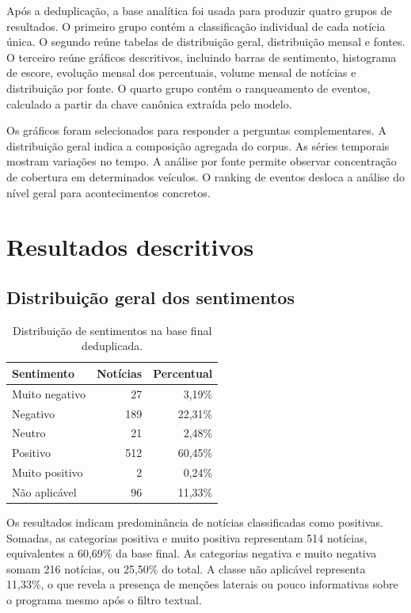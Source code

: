 \documentclass[12pt,a4paper]{article}
\begin{document}
Após a deduplicação, a base analítica foi usada para produzir quatro grupos de resultados. O primeiro grupo contém a classificação individual de cada notícia única. O segundo reúne tabelas de distribuição geral, distribuição mensal e fontes. O terceiro reúne gráficos descritivos, incluindo barras de sentimento, histograma de escore, evolução mensal dos percentuais, volume mensal de notícias e distribuição por fonte. O quarto grupo contém o ranqueamento de eventos, calculado a partir da chave canônica extraída pelo modelo.

Os gráficos foram selecionados para responder a perguntas complementares. A distribuição geral indica a composição agregada do corpus. As séries temporais mostram variações no tempo. A análise por fonte permite observar concentração de cobertura em determinados veículos. O ranking de eventos desloca a análise do nível geral para acontecimentos concretos.

\section{Resultados descritivos}

\subsection{Distribuição geral dos sentimentos}

\begin{table}[H]
\centering
\begin{tabular}{lrr}
\toprule
\textbf{Sentimento} & \textbf{Notícias} & \textbf{Percentual} \\
\midrule
Muito negativo & 27 & 3,19\% \\
Negativo & 189 & 22,31\% \\
Neutro & 21 & 2,48\% \\
Positivo & 512 & 60,45\% \\
Muito positivo & 2 & 0,24\% \\
Não aplicável & 96 & 11,33\% \\
\bottomrule
\end{tabular}
\caption{Distribuição de sentimentos na base final deduplicada.}
\end{table}

Os resultados indicam predominância de notícias classificadas como positivas. Somadas, as categorias positiva e muito positiva representam 514 notícias, equivalentes a 60,69\% da base final. As categorias negativa e muito negativa somam 216 notícias, ou 25,50\% do total. A classe não aplicável representa 11,33\%, o que revela a presença de menções laterais ou pouco informativas sobre o programa mesmo após o filtro textual.
\end{document}
